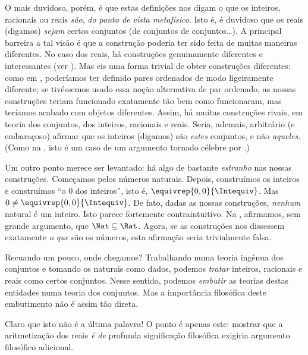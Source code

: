 \documentclass[../../../include/open-logic-section]{subfiles}
\begin{document}
O mais duvidoso, porém, é que estas definições nos digam o que os inteiros, racionais
ou reais \emph{são}, \emph{do ponto de vista metafísico}. Isto é, é duvidoso que
os reais (digamos) \emph{sejam} certos conjuntos (de conjuntos de
conjuntos\ldots). A principal barreira a tal visão é que a construção poderia ter
sido feita de muitas maneiras diferentes. No caso dos reais, há construções
genuinamente diferentes e interessantes (ver ). Mas eis uma
forma trivial de obter construções diferentes: como em
, poderíamos ter definido pares ordenados de modo
ligeiramente diferente; se tivéssemos usado essa noção alternativa de par
ordenado, as nossas construções teriam funcionado exatamente tão bem como
funcionaram, mas teríamos acabado com objetos diferentes. Assim, há muitas
construções rivais, em teoria dos conjuntos, dos inteiros, racionais e reais. Seria,
ademais, arbitrário (e embaraçoso) afirmar que os inteiros (digamos) são
\emph{estes} conjuntos, e não \emph{aqueles}. (Como na ,
isto é um caso de um argumento tornado célebre por \citealt{Benacerraf1965}.)

Um outro ponto merece ser levantado: há algo de bastante \emph{estranho} nas
nossas construções. Começamos pelos números naturais. Depois, construímos os
inteiros e construímos ``o $0$ dos inteiros'', isto é, $\equivrep{0,0}{\Intequiv}$.
Mas $0 \neq \equivrep{0,0}{\Intequiv}$. De fato, dadas as nossas construções,
\emph{nenhum} natural é um inteiro. Isto parece fortemente contraintuitivo.
Na , afirmamos, sem grande argumento, que
$\Nat \subseteq \Rat$. Agora, se as construções nos dissessem exatamente \emph{o que}
são os números, esta afirmação seria trivialmente falsa. 

Recuando um pouco, onde chegamos? Trabalhando numa teoria ingênua dos conjuntos e
tomando os naturais como dados, podemos \emph{tratar} inteiros, racionais e reais
como certos conjuntos. Nesse sentido, podemos \emph{embutir} as teorias destas
entidades numa teoria dos conjuntos. Mas a importância filosófica deste embutimento
não é assim tão direta.

Claro que isto não é a última palavra!{} O ponto é apenas este: mostrar que a
aritmetização dos reais \emph{é de} profunda significação filosófica exigiria
argumento filosófico adicional.

\end{document}
